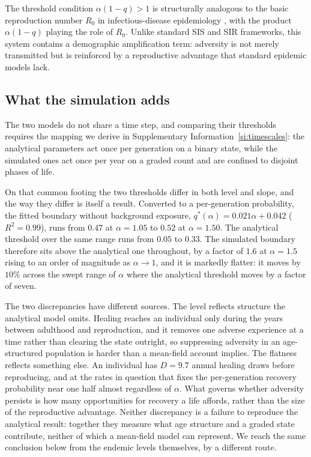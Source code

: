 \documentclass{article}
\begin{document}
The threshold condition \(\alpha(1-q) > 1\) is structurally analogous to the
basic reproduction number \(R_0\) in infectious-disease epidemiology
\cite{hofbauer1998evolutionary}, with the product \(\alpha(1-q)\) playing the
role of \(R_0\).  Unlike standard SIS and SIR frameworks, this system contains a
demographic amplification term: adversity is not merely transmitted but is
reinforced by a reproductive advantage that standard epidemic models lack.

\subsection*{What the simulation adds}

The two models do not share a time step, and comparing their thresholds
requires the mapping we derive in Supplementary
Information~\ref{si:timescales}: the analytical parameters act once per
generation on a binary state, while the simulated ones act once per year on a
graded count and are confined to disjoint phases of life.

On that common footing the two thresholds differ in both level and slope, and
the way they differ is itself a result.  Converted to a per-generation
probability, the fitted boundary without background exposure,
\(q^*(\alpha) = 0.021\alpha + 0.042\) (\(R^2 = 0.99\)), runs from \(0.47\) at
\(\alpha = 1.05\) to \(0.52\) at \(\alpha = 1.50\).  The analytical threshold
over the same range runs from \(0.05\) to \(0.33\).  The simulated boundary
therefore sits above the analytical one throughout, by a factor of \(1.6\) at
\(\alpha = 1.5\) rising to an order of magnitude as \(\alpha \to 1\), and it is
markedly flatter: it moves by \(10\%\) across the swept range of \(\alpha\)
where the analytical threshold moves by a factor of seven.

The two discrepancies have different sources.  The level reflects structure the
analytical model omits.  Healing reaches an individual only during the years
between adulthood and reproduction, and it removes one adverse experience at a
time rather than clearing the state outright, so suppressing adversity in an
age-structured population is harder than a mean-field account implies.  The
flatness reflects something else.  An individual has \(D = 9.7\) annual healing
draws before reproducing, and at the rates in question that fixes the
per-generation recovery probability near one half almost regardless of
\(\alpha\).  What governs whether adversity persists is how many opportunities
for recovery a life affords, rather than the size of the reproductive
advantage.  Neither discrepancy is a failure to reproduce the analytical
result: together they measure what age structure and a graded state contribute,
neither of which a mean-field model can represent.  We reach the same
conclusion below from the endemic levels themselves, by a different route.
\end{document}
